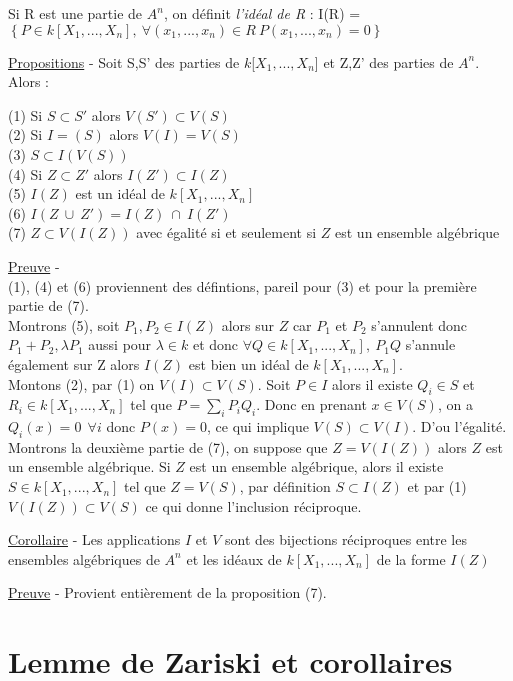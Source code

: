 \documentclass[a4paper,10pt]{article}
\begin{document}
Si R est une partie de $A^{n}$, on définit \textit{l'idéal de R} :
\center
I(R) =$\left\{  P \in k[X_{1},...,X_{n}], \  \forall(x_{1}, ... , x_{n}) \in R \ P(x_{1}, ... , x_{n}) = 0  \right\}$

\underline{Propositions} - Soit S,S' des parties de $k$[$X_{1},...,X_{n}$] et Z,Z' des parties de $A^{n}$. Alors :

 (1) Si $S \subset  S' $ alors $V(S') \subset V(S) $
\\(2) Si $I = (S)$ alors $V(I) =V(S) $
\\(3) $S \subset I(V(S))$
\\ (4) Si $Z \subset Z'$ alors $I(Z') \subset I(Z)$
\\ (5) $I(Z)$ est un idéal de $k[X_{1},...,X_{n}]$
\\ (6) $I(Z \ \cup \ Z') = I(Z)\ \cap \ I(Z')$
\\ (7) $Z\subset V(I(Z)) $ avec égalité si et seulement si $Z$ est un ensemble algébrique

\underline{Preuve} - \\ (1), (4) et (6) proviennent des défintions, pareil pour (3) et pour la première partie de (7).
\\ Montrons (5), soit $P_{1},P_{2} \in I(Z)$ alors sur $Z$ car $P_{1}$ et $P_{2}$ s'annulent donc $P_{1} + P_{2}, \lambda P_{1}$ aussi pour $\lambda \in k$ et donc $\forall Q \in k[X_{1},...,X_{n}], \ P_{1}Q$ s'annule également sur Z alors $I(Z)$ est bien un idéal de $k[X_{1},...,X_{n}]$.
\\ Montons (2), par (1) on $V(I) \subset V(S)$. Soit $P \in I$ alors il existe $ Q_{i} \in S $ et $R_{i} \in k[X_{1},...,X_{n}]$ tel que $P = \sum_{i} P_{i}Q_{i} $. Donc en prenant $ x \in V(S)$, on a $Q_{i}(x) = 0 \  \ \forall i$ donc $ P(x) = 0$, ce qui implique $V(S) \subset V(I)$. D'ou l'égalité.
\\ Montrons la deuxième partie de (7), on suppose que $Z = V(I(Z))$ alors $Z$ est un ensemble algébrique. Si $Z$ est un ensemble algébrique, alors il existe $S \in k[X_{1},...,X_{n}]$ tel que $Z =V(S)$, par définition $S \subset I(Z)$ et par (1) $V(I(Z)) \subset V(S)$ ce qui donne l'inclusion réciproque.

\underline{Corollaire} - Les applications $I$ et $V$ sont des bijections réciproques entre les ensembles algébriques de $ A^{n}$ et les idéaux de $k[X_{1},...,X_{n}]$ de la forme $I(Z)$

\underline{Preuve} - Provient entièrement de la proposition (7). 


\flushleft
\section{Lemme de Zariski et corollaires}
\end{document}
